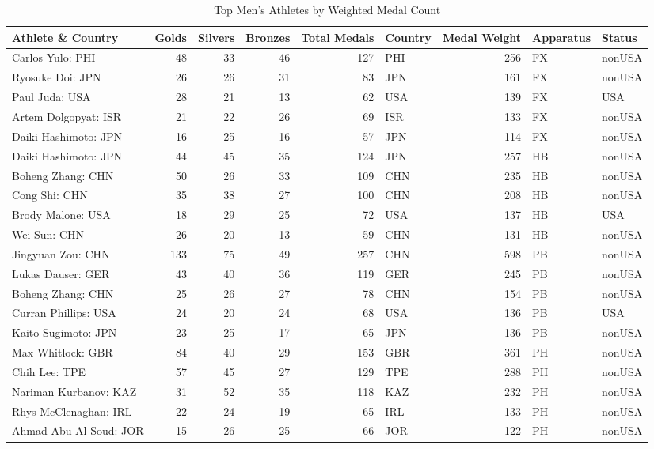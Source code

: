 \documentclass[
  10.5pt,
  letterpaper,
  DIV=11,
  numbers=noendperiod]{scrartcl}
\begin{document}
\begin{table}[H]

\caption{Top Men's Athletes by Weighted Medal Count}
\centering
\fontsize{8}{10}\selectfont
\begin{tabular}[t]{l|r|r|r|r|l|r|l|l}
\hline
Athlete \& Country & Golds & Silvers & Bronzes & Total Medals & Country & Medal Weight & Apparatus & Status\\
\hline
Carlos Yulo: PHI & 48 & 33 & 46 & 127 & PHI & 256 & FX & nonUSA\\
\hline
Ryosuke Doi: JPN & 26 & 26 & 31 & 83 & JPN & 161 & FX & nonUSA\\
\hline
Paul Juda: USA & 28 & 21 & 13 & 62 & USA & 139 & FX & USA\\
\hline
Artem Dolgopyat: ISR & 21 & 22 & 26 & 69 & ISR & 133 & FX & nonUSA\\
\hline
Daiki Hashimoto: JPN & 16 & 25 & 16 & 57 & JPN & 114 & FX & nonUSA\\
\hline
Daiki Hashimoto: JPN & 44 & 45 & 35 & 124 & JPN & 257 & HB & nonUSA\\
\hline
Boheng Zhang: CHN & 50 & 26 & 33 & 109 & CHN & 235 & HB & nonUSA\\
\hline
Cong Shi: CHN & 35 & 38 & 27 & 100 & CHN & 208 & HB & nonUSA\\
\hline
Brody Malone: USA & 18 & 29 & 25 & 72 & USA & 137 & HB & USA\\
\hline
Wei Sun: CHN & 26 & 20 & 13 & 59 & CHN & 131 & HB & nonUSA\\
\hline
Jingyuan Zou: CHN & 133 & 75 & 49 & 257 & CHN & 598 & PB & nonUSA\\
\hline
Lukas Dauser: GER & 43 & 40 & 36 & 119 & GER & 245 & PB & nonUSA\\
\hline
Boheng Zhang: CHN & 25 & 26 & 27 & 78 & CHN & 154 & PB & nonUSA\\
\hline
Curran Phillips: USA & 24 & 20 & 24 & 68 & USA & 136 & PB & USA\\
\hline
Kaito Sugimoto: JPN & 23 & 25 & 17 & 65 & JPN & 136 & PB & nonUSA\\
\hline
Max Whitlock: GBR & 84 & 40 & 29 & 153 & GBR & 361 & PH & nonUSA\\
\hline
Chih Lee: TPE & 57 & 45 & 27 & 129 & TPE & 288 & PH & nonUSA\\
\hline
Nariman Kurbanov: KAZ & 31 & 52 & 35 & 118 & KAZ & 232 & PH & nonUSA\\
\hline
Rhys McClenaghan: IRL & 22 & 24 & 19 & 65 & IRL & 133 & PH & nonUSA\\
\hline
Ahmad Abu Al Soud: JOR & 15 & 26 & 25 & 66 & JOR & 122 & PH & nonUSA\\

\end{tabular}
\end{table}
\end{document}
